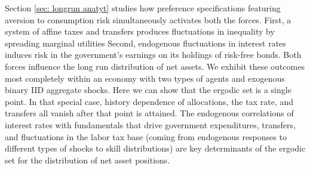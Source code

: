 \documentclass[thmsb,11pt]{article}
\begin{document}
Section \ref{sec: longrun anatyt} studies how preference specifications
featuring aversion to consumption risk simultaneously activates both the forces.  First, a system of affine taxes and transfers produces fluctuations in inequality by spreading marginal utilities %
Second, endogenous fluctuations in interest rates  induces risk in the government's earnings on its holdings of risk-free bonds. Both forces influence the long run distribution of net assets. We exhibit these outcomes most completely within an economy with two types of agents and  exogenous binary IID aggregate shocks.  Here  we can show that the ergodic set is a single point. In that special case, history dependence
of allocations, the tax rate, and transfers all vanish after that point is attained. The endogenous correlations of interest rates with fundamentals
that  drive government expenditures, transfers, and  fluctuations in the labor tax base (coming from endogenous responses to different types of shocks to skill distributions) are key determinants of the ergodic set for the distribution of net asset positions.
% 
% 
% 
% 
\end{document}
